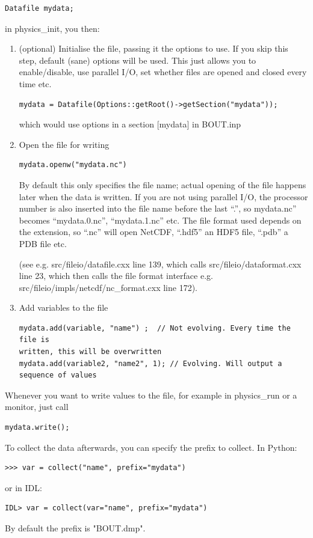 \documentclass[12pt]{article}
\begin{document}
%
\begin{lstlisting}
Datafile mydata;
\end{lstlisting}
%
in physics\_init, you then:

%
\begin{enumerate}
\item (optional) Initialise the file, passing it the options to use. If you
    skip this step, default (sane) options will be used. This just allows you
    to enable/disable, use parallel I/O, set whether files are opened and
    closed every time etc.
%
\begin{lstlisting}
mydata = Datafile(Options::getRoot()->getSection("mydata"));
\end{lstlisting}
%
which would use options in a section [mydata] in BOUT.inp

\item Open the file for writing
%
\begin{lstlisting}
mydata.openw("mydata.nc")
\end{lstlisting}
%
By default this only specifies the file name; actual opening of the file
happens later when the data is written. If you are not using parallel I/O, the
processor number is also inserted into the file name before the last ``.'', so
mydata.nc'' becomes ``mydata.0.nc'', ``mydata.1.nc'' etc. The file format used
depends on the extension, so ``.nc'' will open NetCDF, ``.hdf5'' an HDF5 file,
``.pdb'' a PDB file etc.

(see e.g. src/fileio/datafile.cxx line 139, which calls
src/fileio/dataformat.cxx line 23, which then calls the file format interface
e.g. src/fileio/impls/netcdf/nc\_format.cxx line 172).

\item Add variables to the file
%
\begin{lstlisting}
mydata.add(variable, "name") ;  // Not evolving. Every time the file is
written, this will be overwritten
mydata.add(variable2, "name2", 1); // Evolving. Will output a sequence of values
\end{lstlisting}
%
\end{enumerate}
%
Whenever you want to write values to the file, for example in physics\_run or a
monitor, just call
%
\begin{lstlisting}
mydata.write();
\end{lstlisting}
%
To collect the data afterwards, you can specify the prefix to collect. In
Python:
%
\begin{verbatim}
>>> var = collect("name", prefix="mydata")
\end{verbatim}
%
or in IDL:
%
\begin{verbatim}
IDL> var = collect(var="name", prefix="mydata")
\end{verbatim}
%
By default the prefix is "BOUT.dmp".
\end{document}
